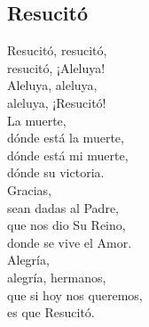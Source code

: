 \subsection{Resucitó}

\begin{center}

{\Large
Resucitó, resucitó,\\
resucitó, ¡Aleluya!\\
Aleluya, aleluya, \\
aleluya, ¡Resucitó!\\
\vspace{1em}
La muerte,\\
dónde está la muerte,\\
dónde está mi muerte,\\
dónde su victoria.\\
\vspace{1em}
Gracias,\\
sean dadas al Padre,\\
que nos dio Su Reino,\\
donde se vive el Amor.\\
\vspace{1em}
Alegría,\\
alegría, hermanos,\\
que si hoy nos queremos,\\
es que Resucitó.}
\end{center}